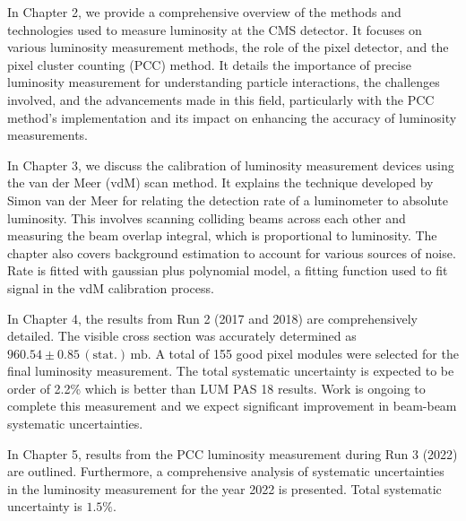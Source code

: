 In Chapter 2, we provide a comprehensive overview of the methods and technologies used to measure luminosity at the CMS detector. It focuses on various luminosity measurement methods, the role of the pixel detector, and the pixel cluster counting (PCC) method. It details the importance of precise luminosity measurement for understanding particle interactions, the challenges involved, and the advancements made in this field, particularly with the PCC method's implementation and its impact on enhancing the accuracy of luminosity measurements.

In Chapter 3, we discuss the calibration of luminosity measurement devices using the van der Meer (vdM) scan method. It explains the technique developed by Simon van der Meer for relating the detection rate of a luminometer to absolute luminosity. This involves scanning colliding beams across each other and measuring the beam overlap integral, which is proportional to luminosity. The chapter also covers background estimation to account for various sources of noise. Rate is fitted with gaussian plus polynomial model, a fitting function used to fit signal in the vdM calibration process.

In Chapter 4, the results from Run 2 (2017 and 2018) are comprehensively detailed. %
The visible cross section was accurately determined as \(960.54 \pm 0.85 \, (\text{stat.}) \, \text{mb}\). A total of 155 good pixel modules were selected for the final luminosity measurement. %
The total systematic uncertainty is expected to be order of 2.2\% which is better than LUM PAS 18 results. Work is ongoing to complete this measurement and we expect significant improvement in beam-beam systematic uncertainties. 

In Chapter 5, results from the PCC luminosity measurement during Run 3 (2022) are outlined. %
Furthermore, a comprehensive analysis of systematic uncertainties in the luminosity measurement for the year 2022 is presented. %
Total systematic uncertainty is \(1.5\%\).


